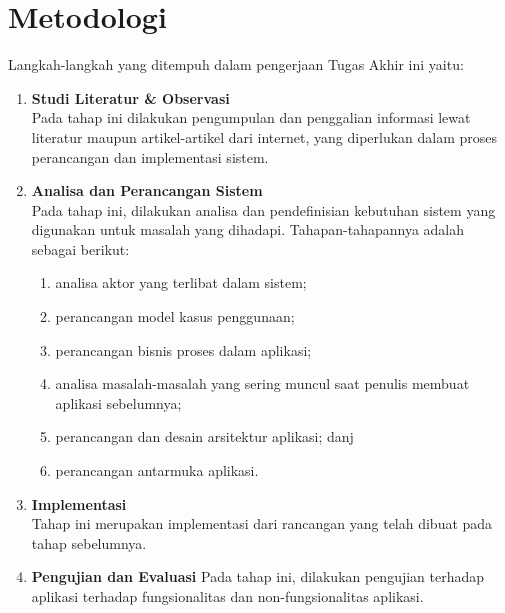     \section{Metodologi}
    \label{metodologi}
	Langkah-langkah yang ditempuh dalam pengerjaan Tugas Akhir ini yaitu:
    \begin{enumerate}
    	\item \textbf{Studi Literatur \& Observasi} \\
		       Pada tahap ini dilakukan pengumpulan dan penggalian informasi lewat literatur maupun artikel-artikel dari internet, yang diperlukan dalam proses perancangan dan implementasi sistem.
    	\item \textbf{Analisa dan Perancangan Sistem}\\
		    	Pada tahap ini, dilakukan analisa dan pendefinisian kebutuhan sistem yang digunakan untuk masalah yang dihadapi. Tahapan-tahapannya adalah sebagai berikut:
		    	\begin{enumerate}[label=(\alph*)]
		    		\item analisa aktor yang terlibat dalam sistem;
		    		\item perancangan model kasus penggunaan;
		    		\item perancangan bisnis proses dalam aplikasi;
		    		\item analisa masalah-masalah yang sering muncul saat penulis membuat aplikasi sebelumnya;
		    		\item perancangan dan desain arsitektur aplikasi; danj
		    		\item perancangan antarmuka aplikasi.
		    	\end{enumerate}
    	\item \textbf{Implementasi}\\
		    	Tahap ini merupakan implementasi dari rancangan yang telah dibuat pada tahap sebelumnya.
    	\item \textbf{Pengujian dan Evaluasi}
		    	Pada tahap ini, dilakukan pengujian terhadap aplikasi terhadap fungsionalitas dan non-fungsionalitas aplikasi. 
	   	\end{enumerate}
	   	
